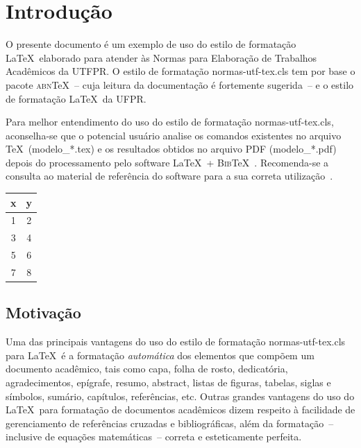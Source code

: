 \documentclass[openright]{normas-utf-tex} %
\begin{document}
\chapter{Introdução}

O presente documento \'e um exemplo de uso do estilo de formata\c{c}\~ao \LaTeX\ elaborado para atender \`as Normas para Elabora\c{c}\~ao de Trabalhos Acad\^emicos da UTFPR. O estilo de formata\c{c}\~ao {\ttfamily normas-utf-tex.cls} tem por base o pacote \textsc{abn}\TeX~-- cuja leitura da documenta\c{c}\~ao \cite{abnTeX2009} \'e fortemente sugerida~-- e o estilo de formata\c{c}\~ao \LaTeX\ da UFPR.

Para melhor entendimento do uso do estilo de formata\c{c}\~ao {\ttfamily normas-utf-tex.cls}, aconselha-se que o potencial usu\'ario analise os comandos existentes no arquivo \TeX\ ({\ttfamily modelo\_*.tex}) e os resultados obtidos no arquivo PDF ({\ttfamily modelo\_*.pdf}) depois do processamento pelo software \LaTeX\ + \textsc{Bib}\TeX~\cite{LaTeX2009,BibTeX2009}. Recomenda-se a consulta ao material de refer\^encia do software para a sua correta utiliza\c{c}\~ao~\cite{Lamport1986,Buerger1989,Kopka2003,Mittelbach2004}.

\begin{quadro}[!htb]
	\centering
	\caption[Exemplo de um quadro]{Exemplo de um quadro mostrando a correla\c{c}\~ao entre x e y.}
	\label{tab:correlacao}
	\begin{tabular}{cc}
		\hline 
		x & y \\
		\hline
		1 & 2 \\
		3 & 4 \\
		5 & 6 \\
		7 & 8 \\
		\hline 
	\end{tabular}
\end{quadro}

\section{Motivação}

Uma das principais vantagens do uso do estilo de formata\c{c}\~ao {\ttfamily normas-utf-tex.cls} para \LaTeX\ \'e a formata\c{c}\~ao \textit{autom\'atica} dos elementos que comp\~oem um documento acad\^emico, tais como capa, folha de rosto, dedicat\'oria, agradecimentos, ep\'igrafe, resumo, abstract, listas de figuras, tabelas, siglas e s\'imbolos, sum\'ario, cap\'itulos, refer\^encias, etc. Outras grandes vantagens do uso do \LaTeX\ para formata\c{c}\~ao de documentos acad\^emicos dizem respeito \`a facilidade de gerenciamento de refer\^encias cruzadas e bibliogr\'aficas, al\'em da formata\c{c}\~ao~-- inclusive de equa\c{c}\~oes  matem\'aticas~-- correta e esteticamente perfeita.
\end{document}
